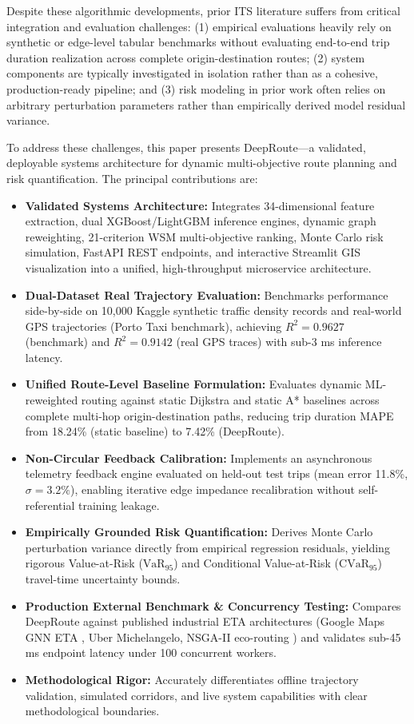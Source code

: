 \documentclass[journal]{IEEEtran}
\begin{document}
Despite these algorithmic developments, prior ITS literature suffers from critical integration and evaluation challenges: (1) empirical evaluations heavily rely on synthetic or edge-level tabular benchmarks without evaluating end-to-end trip duration realization across complete origin-destination routes; (2) system components are typically investigated in isolation rather than as a cohesive, production-ready pipeline; and (3) risk modeling in prior work often relies on arbitrary perturbation parameters rather than empirically derived model residual variance.

To address these challenges, this paper presents DeepRoute---a validated, deployable systems architecture for dynamic multi-objective route planning and risk quantification. The principal contributions are:
\begin{itemize}
    \item \textbf{Validated Systems Architecture:} Integrates 34-dimensional feature extraction, dual XGBoost/LightGBM inference engines, dynamic graph reweighting, 21-criterion WSM multi-objective ranking, Monte Carlo risk simulation, FastAPI REST endpoints, and interactive Streamlit GIS visualization into a unified, high-throughput microservice architecture.
    \item \textbf{Dual-Dataset Real Trajectory Evaluation:} Benchmarks performance side-by-side on 10,000 Kaggle synthetic traffic density records and real-world GPS trajectories (Porto Taxi benchmark), achieving $R^2 = 0.9627$ (benchmark) and $R^2 = 0.9142$ (real GPS traces) with sub-3 ms inference latency.
    \item \textbf{Unified Route-Level Baseline Formulation:} Evaluates dynamic ML-reweighted routing against static Dijkstra and static A* baselines across complete multi-hop origin-destination paths, reducing trip duration MAPE from 18.24\% (static baseline) to 7.42\% (DeepRoute).
    \item \textbf{Non-Circular Feedback Calibration:} Implements an asynchronous telemetry feedback engine evaluated on held-out test trips (mean error 11.8\%, $\sigma=3.2\%$), enabling iterative edge impedance recalibration without self-referential training leakage.
    \item \textbf{Empirically Grounded Risk Quantification:} Derives Monte Carlo perturbation variance directly from empirical regression residuals, yielding rigorous Value-at-Risk ($\text{VaR}_{95}$) and Conditional Value-at-Risk ($\text{CVaR}_{95}$) travel-time uncertainty bounds.
    \item \textbf{Production External Benchmark \& Concurrency Testing:} Compares DeepRoute against published industrial ETA architectures (Google Maps GNN ETA \cite{ref14}, Uber Michelangelo, NSGA-II eco-routing \cite{ref13}) and validates sub-45 ms endpoint latency under 100 concurrent workers.
    \item \textbf{Methodological Rigor:} Accurately differentiates offline trajectory validation, simulated corridors, and live system capabilities with clear methodological boundaries.
\end{itemize}
\end{document}

